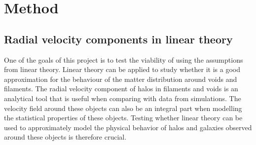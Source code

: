 \chapter{Method}\label{sec:method}
\section{Radial velocity components in linear theory}\label{sec:radlintheory}
One of the goals of this project is to test the viability of using the assumptions
from linear theory. Linear theory can be applied to study whether it is a good approximation for the behaviour of the matter distribution around voids and filaments. The radial velocity component of
halos in filaments and voids is an analytical tool that is useful when comparing
with data from simulations. The velocity field around these objects can also be an integral part when modelling the statistical properties of these objects. Testing whether linear theory can be used to
approximately model the physical behavior of halos and galaxies observed around these objects is therefore crucial.
